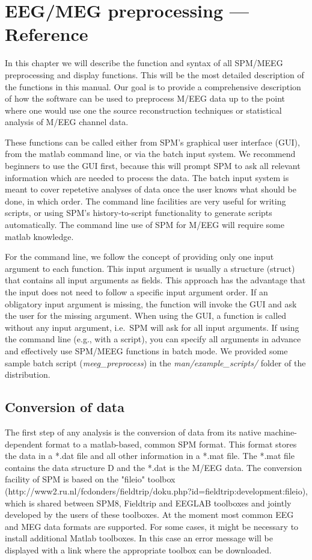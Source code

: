 \chapter{EEG/MEG preprocessing --- Reference
  \label{Chap:eeg:preprocessing}} 

In this chapter we will describe the function and syntax of all 
SPM/MEEG preprocessing and display functions. This will be the most
detailed description of the functions  in this
manual. Our goal is to provide a comprehensive description of how the
software can be used to preprocess M/EEG data up to the point where
one would use one the source reconstruction techniques or statistical
analysis of M/EEG channel data.

These functions can be called either from SPM's graphical user
interface (GUI), from the matlab command line, or via the batch input
system. We recommend beginners to use the GUI first, because this will
prompt SPM to ask all relevant information which are needed to process
the data. The batch input system is meant to cover repetetive analyses
of data once the user knows what should be done, in which order. The
command line facilities are very useful for writing scripts, or using
SPM's history-to-script functionality to generate scripts
automatically. The command line use of SPM for M/EEG will require some
matlab knowledge.

For the command line, we follow the concept of providing only one
input argument to each function. This input argument is usually a 
structure (struct) that contains all input arguments as fields. This
approach has the advantage that the input does not need to follow a
specific input argument order. If an obligatory input argument is
missing, the function will invoke the GUI and ask the user for the
missing argument. When using the GUI, a function is called without any
input argument, i.e.~SPM will ask for all input arguments. If using
the command line (e.g., with a script), you can specify all arguments
in advance and effectively use SPM/MEEG functions in batch mode. We
provided some sample batch script (\textit{meeg\_preprocess}) in the
\textit{man/example\_scripts/} folder of the distribution.

\section{Conversion of data}
The first step of any analysis is the conversion of data from its
native machine-dependent format to a matlab-based, common SPM
format. This format stores the data in a *.dat file and all other
information in a *.mat file. The *.mat file contains the data
structure D and the *.dat is the M/EEG data. The conversion facility
of SPM is based on the "fileio" toolbox
(http://www2.ru.nl/fcdonders/fieldtrip/doku.php?id=fieldtrip:development:fileio),
which is shared between SPM8, Fieldtrip and EEGLAB toolboxes and
jointly developed by the users of these toolboxes. At the moment most
common EEG and MEG data formats are supported. For some cases, it
might be necessary to install additional Matlab toolboxes. In this
case an error message will be displayed with a link where the
appropriate toolbox can be downloaded.

